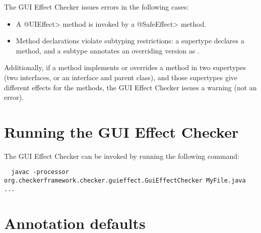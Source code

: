 The GUI Effect Checker issues errors in the following cases:


\begin{itemize}
\item
  A \<@UIEffect> method is invoked by a \<@SafeEffect> method.

\item
  Method declarations violate subtyping restrictions:  a supertype declares
  a  method, and a subtype annotates an overriding
  version as .

\end{itemize}

Additionally, if a method implements or overrides a method in two
supertypes (two interfaces, or an interface and parent class), and those
supertypes give different effects for the methods, the GUI Effect Checker
issues a warning (not an error).



%


\section{Running the GUI Effect Checker\label{guieffect-running}}

The GUI Effect Checker can be invoked by running the following command:
\begin{Verbatim}
  javac -processor org.checkerframework.checker.guieffect.GuiEffectChecker MyFile.java ...
\end{Verbatim}


\section{Annotation defaults\label{guieffect-defaults}}

